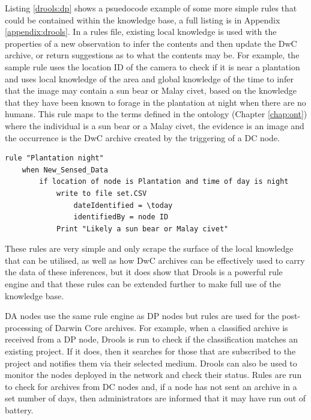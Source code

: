 		Listing \ref{drools:dp} shows a psuedocode example of some more simple rules that could be contained within the knowledge base, a full listing is in Appendix \ref{appendix:drools}. In a rules file, existing local knowledge is used with the properties of a new observation to infer the contents and then update the DwC archive, or return suggestions as to what the contents may be. For example, the sample rule uses the location ID of the camera to check if it is near a plantation and uses local knowledge of the area and global knowledge of the time to infer that the image may contain a sun bear or Malay civet, based on the knowledge that they have been known to forage in the plantation at night when there are no humans. This rule maps to the terms defined in the ontology (Chapter \ref{chap:ont}) where the individual is a sun bear or a Malay civet, the evidence is an image and the occurrence is the DwC archive created by the triggering of a DC node.
		
		\vspace{\baselineskip}
		\begin{lstlisting}[breaklines=true, caption={Pseudocode of a Drools Rules File}, label={drools:dp}]
rule "Plantation night"
	when New_Sensed_Data
		if location of node is Plantation and time of day is night
			write to file set.CSV
				dateIdentified = \today		
				identifiedBy = node ID
			Print "Likely a sun bear or Malay civet"
				\end{lstlisting}
		These rules are very simple and only scrape the surface of the local knowledge that can be utilised, as well as how DwC archives can be effectively used to carry the data of these inferences, but it does show that Drools is a powerful rule engine and that these rules can be extended further to make full use of the knowledge base. 
		
		DA nodes use the same rule engine as DP nodes but rules are used for the post-processing of Darwin Core archives. For example, when a classified archive is received from a DP node, Drools is run to check if the classification matches an existing project. If it does, then it searches for those that are subscribed to the project and notifies them via their selected medium. Drools can also be used to monitor the nodes deployed in the network and check their status. Rules are run to check for archives from DC nodes and, if a node has not sent an archive in a set number of days, then administrators are informed that it may have run out of battery.
		

